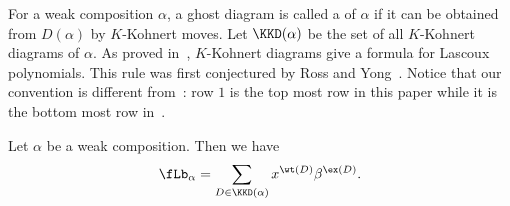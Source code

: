 For a weak composition $\alpha$,
a ghost diagram is called a 
of $\alpha$ if it can be obtained from $D(\alpha)$
by $K$-Kohnert moves. 
Let $\KKD(\alpha)$ be the set of all $K$-Kohnert diagrams
of $\alpha$.
As proved in~\cite{PY}, 
$K$-Kohnert diagrams give a formula for Lascoux polynomials. 
This rule was first conjectured by Ross and Yong~\cite{RossY}.
Notice that our convention is different from~\cite{PY}:
row $1$ is the top most row in this paper while it is the 
bottom most row in~\cite{PY}. 

\begin{ourthm}[\cite{PY}]\label{thm: k.kohnert}
Let $\alpha$ be a weak composition.
Then we have
$$
\fLb_\alpha = \sum_{D \in \KKD(\alpha)}x^{\wt(D)} \beta^{\ex(D)}.
$$
\end{ourthm}

